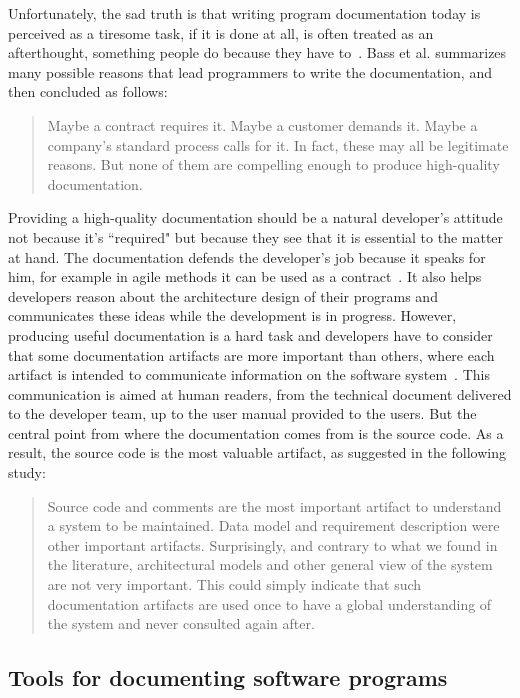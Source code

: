 Unfortunately, the sad truth is that writing program documentation today is perceived as a tiresome task, if it is done at all, is often treated as an afterthought, something people do because they have to~\citep{sousa1998survey}. Bass et al. summarizes many possible reasons that lead programmers to write the documentation, and then concluded as follows:

\blockquote{Maybe a contract requires it. Maybe a customer demands it. Maybe a company's standard process calls for it. In fact, these may all be legitimate reasons. But none of them are compelling enough to produce high-quality documentation.~\citep[p. 327]{BassClementsKazman201210}}

Providing a high-quality documentation should be a natural developer's attitude not because it's ``required" but because they see that it is essential to the matter at hand. The documentation defends the developer's job because it speaks for him, for example in agile methods it can be used as a contract~\citep{ambler2007agile}. It also helps developers reason about the architecture design of their programs and communicates these ideas while the development is in progress. However, producing useful documentation is a hard task and developers have to consider that some documentation artifacts are more important than others, where each artifact is intended to communicate information on the software system~\citep{forward2002relevance}. This communication is aimed at human readers, from the technical document delivered to the developer team, up to the user manual provided to the users. But the central point from where the documentation comes from is the source code. As a result, the source code is the most valuable artifact, as suggested in the following study:

\blockquote{Source code and comments are the most important artifact to understand a system to be maintained. Data model and requirement description were other important artifacts. Surprisingly, and contrary to what we found in the literature, architectural models and
other general view of the system are not very important. This could simply indicate that such documentation artifacts are used once to have a global understanding of the system and never consulted again after.~\citep[p. 74]{de2005study}}

\subsection{Tools for documenting software programs}
\label{subsec:generalprograms}

